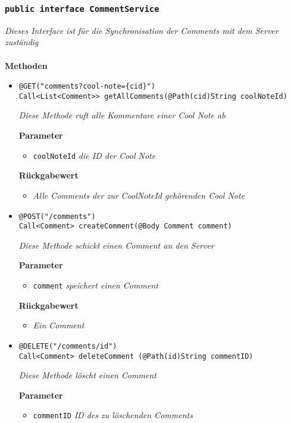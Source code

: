 		\subsubsection{\texttt{public interface CommentService }}
\textit{Dieses Interface ist für die Synchronisation der Comments mit dem Server zuständig}\\
\\
	\textbf{Methoden} 
		\begin{itemize}
		\item\texttt{{@GET("comments?cool-note=\{cid\}")\\ Call<List<Comment>> getAllComments(@Path(\grqq cid\grqq)String coolNoteId)}}

		\textit{Diese Methode ruft alle Kommentare einer Cool Note ab}

		\textbf{Parameter} 
		\begin{itemize}
			\item\texttt{coolNoteId}
		 	\textit{die ID der Cool Note}
	 	\end{itemize}

		\textbf{Rückgabewert} 
		\begin{itemize}
			\item\textit{Alle Comments der zur CoolNoteId gehörenden Cool Note}
	 	\end{itemize}


      \item\texttt{{@POST("/comments")
\\ Call<Comment> createComment(@Body Comment comment)}}

		\textit{Diese Methode schickt einen Comment an den Server }

		\textbf{Parameter} 
			\begin{itemize}
				\item\texttt{comment}
		 		\textit{speichert einen Comment}
	 		\end{itemize}


		\textbf{Rückgabewert} 
		\begin{itemize}
			\item\textit{Ein Comment}
	 	\end{itemize}
		

	 \item\texttt{{@DELETE("/comments/{id}")\\ Call<Comment> deleteComment (@Path(\grqq id\grqq)String commentID)}}

		\textit{Diese Methode löscht einen Comment }
		
		\textbf{Parameter} 
			\begin{itemize}
				\item\texttt{commentID}
		 		\textit{ID des zu löschenden Comments}
	 		\end{itemize}

	 \end{itemize}


